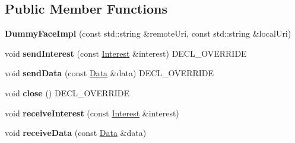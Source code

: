 \subsection*{Public Member Functions}
\begin{DoxyCompactItemize}
\item 
{\bfseries Dummy\+Face\+Impl} (const std\+::string \&remote\+Uri, const std\+::string \&local\+Uri)\hypertarget{classnfd_1_1tests_1_1DummyFaceImpl_a817065fde1af990ecc17a08c7c54d6f4}{}\label{classnfd_1_1tests_1_1DummyFaceImpl_a817065fde1af990ecc17a08c7c54d6f4}

\item 
void {\bfseries send\+Interest} (const \hyperlink{classndn_1_1Interest}{Interest} \&interest) D\+E\+C\+L\+\_\+\+O\+V\+E\+R\+R\+I\+DE\hypertarget{classnfd_1_1tests_1_1DummyFaceImpl_a46056c0d5f037504ca2388907841207e}{}\label{classnfd_1_1tests_1_1DummyFaceImpl_a46056c0d5f037504ca2388907841207e}

\item 
void {\bfseries send\+Data} (const \hyperlink{classndn_1_1Data}{Data} \&data) D\+E\+C\+L\+\_\+\+O\+V\+E\+R\+R\+I\+DE\hypertarget{classnfd_1_1tests_1_1DummyFaceImpl_a55b6aa7a758b7615ee268b0c2dc21962}{}\label{classnfd_1_1tests_1_1DummyFaceImpl_a55b6aa7a758b7615ee268b0c2dc21962}

\item 
void {\bfseries close} () D\+E\+C\+L\+\_\+\+O\+V\+E\+R\+R\+I\+DE\hypertarget{classnfd_1_1tests_1_1DummyFaceImpl_ac1702e49d224689edfc5e0f3e560c4f3}{}\label{classnfd_1_1tests_1_1DummyFaceImpl_ac1702e49d224689edfc5e0f3e560c4f3}

\item 
void {\bfseries receive\+Interest} (const \hyperlink{classndn_1_1Interest}{Interest} \&interest)\hypertarget{classnfd_1_1tests_1_1DummyFaceImpl_a222704fd94d9492b81abf81d7e0b5151}{}\label{classnfd_1_1tests_1_1DummyFaceImpl_a222704fd94d9492b81abf81d7e0b5151}

\item 
void {\bfseries receive\+Data} (const \hyperlink{classndn_1_1Data}{Data} \&data)\hypertarget{classnfd_1_1tests_1_1DummyFaceImpl_a68ad651f7b96bb652270fc61c39541fb}{}\label{classnfd_1_1tests_1_1DummyFaceImpl_a68ad651f7b96bb652270fc61c39541fb}

\end{DoxyCompactItemize}

